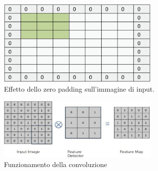 \begin{description}
       \begin{figure}[h]
           \centering
           \includegraphics[width=0.7\textwidth]{images/CNN/fig_Padding.png}
           \caption{Effetto dello zero padding sull'immagine di input. \cite{8308186}}
           \label{fig:Padding}
       \end{figure}

    \begin{figure}[h]
        \centering
        \includegraphics[width=0.7\textwidth]{images/ConvLayer_resize.png}
        \caption{Funzionamento della convoluzione \cite{9077735}}
        \label{fig:ConvKernel}
    \end{figure}
    

\end{description}
